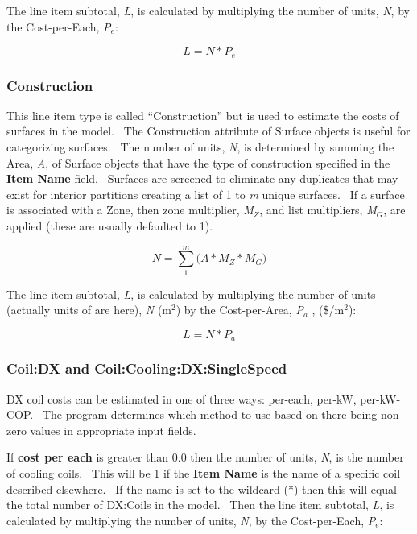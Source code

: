 The line item subtotal, \emph{L}, is calculated by multiplying the number of units, \emph{N}, by the Cost-per-Each, \emph{P\(_{e}\)}:

\begin{equation}
L = N * {P_e}
\end{equation}

\subsubsection{Construction}\label{construction}

This line item type is called ``Construction'' but is used to estimate the costs of surfaces in the model.~ The Construction attribute of Surface objects is useful for categorizing surfaces.~ The number of units, \emph{N}, is determined by summing the Area, \emph{A}, of Surface objects that have the type of construction specified in the \textbf{Item Name} field.~ Surfaces are screened to eliminate any duplicates that may exist for interior partitions creating a list of 1 to \emph{m} unique surfaces.~ If a surface is associated with a Zone, then zone multiplier, \emph{M\(_{Z}\)}, and list multipliers, \emph{M\(_{G}\)}, are applied (these are usually defaulted to 1).

\begin{equation}
N = \sum\limits_1^m {(A*{M_Z} * {M_G}} )
\end{equation}

The line item subtotal, \emph{L}, is calculated by multiplying the number of units (actually units of are here), \emph{N} (m\(^{2}\)) by the Cost-per-Area, \emph{P\(_{a}\)} , (\$/m\(^{2}\)):

\begin{equation}
L = N * {P_a}
\end{equation}

\subsubsection{Coil:DX and Coil:Cooling:DX:SingleSpeed}\label{coildx-and-coilcoolingdxsinglespeed}

DX coil costs can be estimated in one of three ways: per-each, per-kW, per-kW-COP.~ The program determines which method to use based on there being non-zero values in appropriate input fields.

If \textbf{cost per each} is greater than 0.0 then the number of units, \emph{N}, is the number of cooling coils.~ This will be 1 if the \textbf{Item Name} is the name of a specific coil described elsewhere.~ If the name is set to the wildcard (*) then this will equal the total number of DX:Coils in the model.~ Then the line item subtotal, \emph{L}, is calculated by multiplying the number of units, \emph{N}, by the Cost-per-Each, \emph{P\(_{e}\)}:

